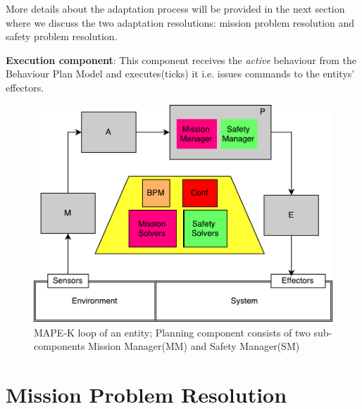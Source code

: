 \documentclass[journal]{IEEEtran}
\theoremstyle{definition}
\newcommand\darko[1]{\nb{Darko}{#1}}
\begin{document}

More details about the adaptation process will be provided in the next section where we discuss the two adaptation resolutions: mission problem resolution and safety problem resolution. 

\textbf{Execution component}: This component receives   the \textit{active} behaviour from the Behaviour Plan Model and executes(ticks) it i.e. issues commands to the entitys' effectors.









\begin{figure}[h]
\includegraphics[width=.5\textwidth]{Figures/MAPE-K_FF.pdf}
\caption{MAPE-K loop of an entity; Planning component consists of two sub-components Mission Manager(MM) and Safety Manager(SM) }\label{fig:agentsArchitecture}
\end{figure}







\section{Mission Problem Resolution}

 
\end{document}
